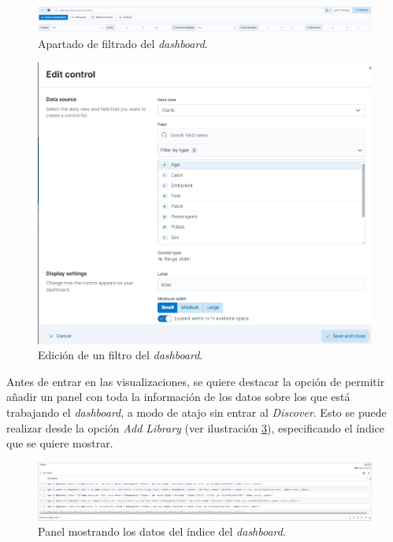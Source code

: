 \begin{figure}
    \centering
    \includegraphics[width=1\linewidth]{img/kibana9.png}
    \caption{Apartado de filtrado del \textit{dashboard}.}
    \label{fig:kibana9}
\end{figure}

\begin{figure}
    \centering
    \includegraphics[width=1\linewidth]{img/kibana10.png}
    \caption{Edición de un filtro del \textit{dashboard}.}
    \label{fig:kibana10}
\end{figure}

Antes de entrar en las visualizaciones, se quiere destacar la opción de permitir añadir un panel con toda la información de los datos sobre los que está trabajando el \textit{dashboard}, a modo de atajo sin entrar al \textit{Discover}. Esto se puede realizar desde la opción \textit{Add Library} (ver ilustración  \ref{fig:kibana11}), especificando el índice que se quiere mostrar.

\begin{figure}
    \centering
    \includegraphics[width=1\linewidth]{img/kibana11.png}
    \caption{Panel mostrando los datos del índice del \textit{dashboard}.}
    \label{fig:kibana11}
\end{figure}

